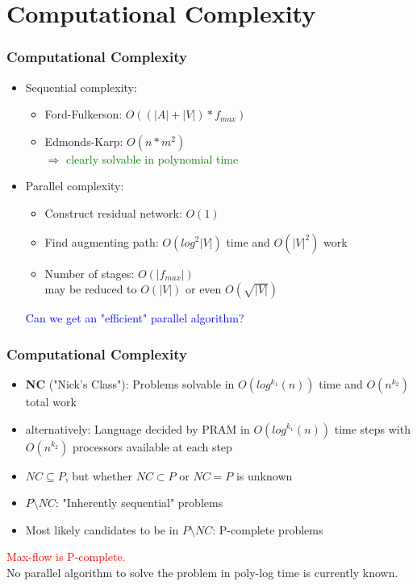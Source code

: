 \documentclass{beamer}
\begin{document}
\section{Computational Complexity}
\begin{frame}
	\frametitle{Computational Complexity}
	\begin{itemize}
		\item Sequential complexity:
		\begin{itemize}
			\item Ford-Fulkerson: $O((|A|+|V|)*f_{max})$
			\item Edmonds-Karp: $O(n*m^2)$
			\pause \\	
			$\Rightarrow$ \textcolor{green}{clearly solvable in polynomial time}
		\end{itemize}
		\pause
		\item Parallel complexity:
		\begin{itemize}
			\item Construct residual network: $O(1)$
			\item Find augmenting path: $O(log^{2}|V|)$ time and $O(|V|^{2})$ work
			\item Number of stages: $O(|f_{max}|)$\\
			may be reduced to $O(|V|)$ or even $O(\sqrt{|V|})$
		\end{itemize}			
		\pause
		\textcolor{blue}{Can we get an "efficient" parallel algorithm?}
	\end{itemize}
\end{frame}

\begin{frame}
	\frametitle{Computational Complexity}
	\begin{itemize}
	\item \textbf{NC} ("Nick's Class"): Problems solvable in $O(log^{k_1}(n))$ time and $O(n^{k_2})$ total work
	\item alternatively: Language decided by PRAM in $O(log^{k_1}(n))$ time steps with $O(n^{k_2})$ processors available at each step 
	\item $NC \subseteq P$, but whether $NC \subset P$ or $NC = P$ is unknown 
	\item $P \setminus NC$: "Inherently sequential"  problems
	\item Most likely candidates to be in $P \setminus NC$: P-complete problems
	\end{itemize}

	\pause	
	\textcolor{red}{Max-flow is P-complete.} \\
	No parallel algorithm to solve the problem in poly-log time is currently known.	
\end{frame}
\end{document}

